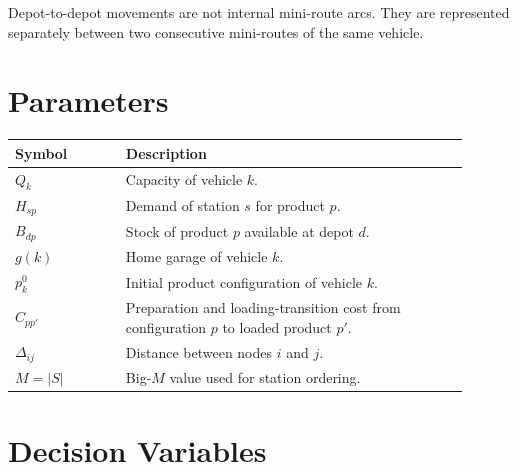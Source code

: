 \documentclass[11pt,a4paper]{article}
\begin{document}
Depot-to-depot movements are not internal mini-route arcs. They are represented
separately between two consecutive mini-routes of the same vehicle.

\section{Parameters}

\begin{table}[h]
\centering
\begin{tabular}{p{0.22\linewidth}p{0.68\linewidth}}
\toprule
Symbol & Description \\
\midrule
\(Q_k\) & Capacity of vehicle \(k\). \\
\(H_{sp}\) & Demand of station \(s\) for product \(p\). \\
\(B_{dp}\) & Stock of product \(p\) available at depot \(d\). \\
\(g(k)\) & Home garage of vehicle \(k\). \\
\(p^0_k\) & Initial product configuration of vehicle \(k\). \\
\(C_{pp'}\) & Preparation and loading-transition cost from configuration \(p\) to loaded product \(p'\). \\
\(\Delta_{ij}\) & Distance between nodes \(i\) and \(j\). \\
\(M=|S|\) & Big-\(M\) value used for station ordering. \\
\bottomrule
\end{tabular}
\end{table}

\section{Decision Variables}
\end{document}
